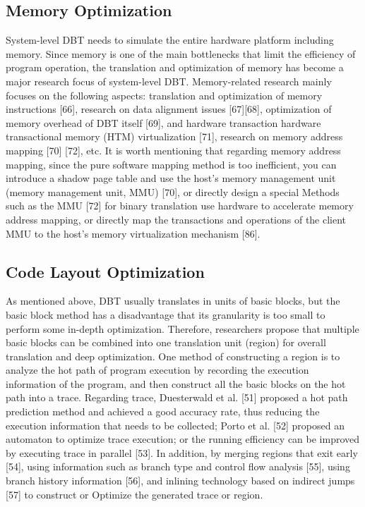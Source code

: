 \subsection{Memory Optimization}
System-level DBT needs to simulate the entire hardware platform including memory.
Since memory is one of the main bottlenecks that limit the efficiency of program operation, the translation and optimization of memory has become a major research focus of system-level DBT.
Memory-related research mainly focuses on the following aspects: translation and optimization of memory instructions [66], research on data alignment issues [67][68], optimization of memory overhead of DBT itself [69], and hardware transaction hardware transactional memory (HTM) virtualization [71], research on memory address mapping [70] [72], etc.
It is worth mentioning that regarding memory address mapping, since the pure software mapping method is too inefficient, you can introduce a shadow page table and use the host's memory management unit (memory management unit, MMU) [70], or directly design a special Methods such as the MMU [72] for binary translation use hardware to accelerate memory address mapping, or directly map the transactions and operations of the client MMU to the host's memory virtualization mechanism [86].

\subsection{Code Layout Optimization}
As mentioned above, DBT usually translates in units of basic blocks, but the basic block method has a disadvantage that its granularity is too small to perform some in-depth optimization.
Therefore, researchers propose that multiple basic blocks can be combined into one translation unit (region) for overall translation and deep optimization.
One method of constructing a region is to analyze the hot path of program execution by recording the execution information of the program, and then construct all the basic blocks on the hot path into a trace.
Regarding trace, Duesterwald et al. [51] proposed a hot path prediction method and achieved a good accuracy rate, thus reducing the execution information that needs to be collected; Porto et al. [52] proposed an automaton to optimize trace execution; or the running efficiency can be improved by executing trace in parallel [53].
In addition, by merging regions that exit early [54], using information such as branch type and control flow analysis [55], using branch history information [56], and inlining technology based on indirect jumps [57] to construct or Optimize the generated trace or region.

